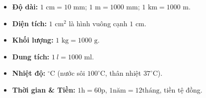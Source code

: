 \documentclass[11pt,a4paper]{article}
\begin{document}
\begin{minipage}[t]{0.49\textwidth}\vspace{0pt}
\begin{tcolorbox}[
  enhanced,
  colback=teal!4!white,
  colframe=teal!75!black,
  arc=2mm, boxrule=0.8pt,
  left=2mm, right=2mm, top=1.8mm, bottom=1.8mm,
  title={\footnotesize\bfseries\color{white}\faSliders\ 2. Toàn bộ Hệ Đo lường lớp 3}
]
{\footnotesize
\begin{itemize}\setlength{\itemsep}{1.5pt}\setlength{\leftskip}{-2.5mm}
  \item \textbf{Độ dài:} $1\text{ cm} = 10\text{ mm}$; $1\text{ m} = 1000\text{ mm}$; $1\text{ km} = 1000\text{ m}$.
  \item \textbf{Diện tích:} $1\text{ cm}^2$ là hình vuông cạnh $1\text{ cm}$.
  \item \textbf{Khối lượng:} $1\text{ kg} = 1000\text{ g}$.
  \item \textbf{Dung tích:} $1\ l = 1000\text{ ml}$.
  \item \textbf{Nhiệt độ:} $^\circ\text{C}$ (nước sôi $100^\circ\text{C}$, thân nhiệt $37^\circ\text{C}$).
  \item \textbf{Thời gian \& Tiền:} $1\text{h}=60\text{p}$, $1\text{năm}=12\text{tháng}$, tiền tệ đồng.
\end{itemize}
}
\end{tcolorbox}
\end{minipage}
\end{document}
